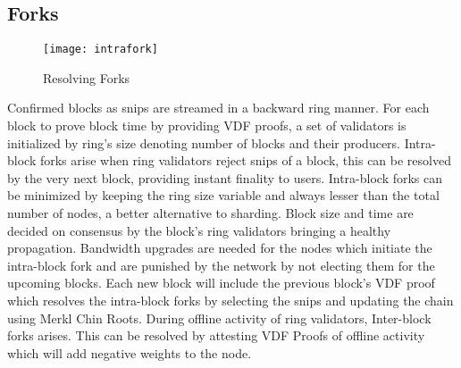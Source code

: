 \documentclass[../Bitcoin Blink.tex]{subfiles}
\begin{document}
\subsection{Forks}
\begin{figure}[H]
\begin{center}
\texttt{[image: intrafork]}
\caption{Resolving Forks}
\end{center}
\end{figure}
Confirmed blocks as snips are streamed in a backward ring manner. For each block to prove block time by providing VDF proofs, a set of validators is initialized by ring's size denoting number of blocks and their producers. Intra-block forks arise when ring validators reject snips of a block, this can be resolved by the very next block, providing instant finality to users. Intra-block forks can be minimized by keeping the ring size variable and always lesser than the total number of nodes, a better alternative to sharding. Block size and time are decided on consensus by the block's ring validators bringing a healthy propagation. Bandwidth upgrades are needed for the nodes which initiate the intra-block fork and are punished by the network by not electing them for the upcoming blocks. Each new block will include the previous block's VDF proof which resolves the intra-block forks by selecting the snips and updating the chain using Merkl Chin Roots. During offline activity of ring validators, Inter-block forks arises. This can be resolved by attesting VDF Proofs of offline activity which will add negative weights to the node.
\end{document}
